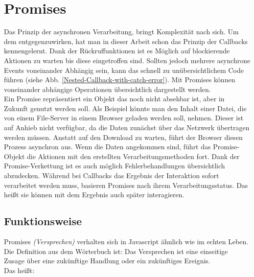 \section{Promises}

Das Prinzip der asynchronen Verarbeitung, bringt Komplexität nach sich. Um dem entgegenzuwirken, hat man in dieser Arbeit schon das Prinzip der Callbacks kennengelernt. Dank der Rückruffunktionen ist es Möglich auf blockierende Aktionen zu warten bis diese eingetroffen sind. Sollten jedoch mehrere asynchrone Events voneinander Abhängig sein, kann das schnell zu unübersichtlichem Code führen (siehe Abb. \ref{Nested-Callback-with-catch-error}). Mit Promises können voneinander abhängige Operationen übersichtlich dargestellt werden.\\

\noindent
Ein Promise repräsentiert ein Objekt das noch nicht absehbar ist, aber in Zukunft genutzt werden soll. Als Beispiel könnte man den Inhalt einer Datei, die von einem File-Server in einem Browser geladen werden soll, nehmen. Dieser ist auf Anhieb nicht verfügbar, da die Daten zunächst über das Netzwerk übertragen werden müssen. Anstatt auf den Download zu warten, führt der Browser diesen Prozess asynchron aus. Wenn die Daten angekommen sind, führt das Promise-Objekt die Aktionen mit den erstellten Verarbeitungsmethoden fort. Dank der Promise-Verkettung ist es auch möglich Fehlerbehandlungen übersichtlich abzudecken. Während bei Callbacks das Ergebnis der Interaktion sofort verarbeitet werden muss, basieren Promises nach ihrem Verarbeitungsstatus. Das heißt sie können mit dem Ergebnis auch \glqq{}später\grqq{} interagieren.

\subsection{Funktionsweise}

\noindent
Promises \textit{(Versprechen)} verhalten sich in Javascript ähnlich wie im echten Leben. Die Definition aus dem Wörterbuch ist: Das Versprechen ist eine einseitige Zusage über eine zukünftige Handlung oder ein zukünftiges Ereignis. \cite{versprechen} \\

\noindent
Das heißt:

